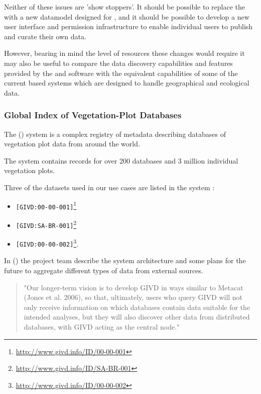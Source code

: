 \documentclass{article}
\begin{document}
Neither of these issues are 'show stoppers'. It should be possible to replace the \cite{ivoa}
\cite{ivoa.obscore} with a new datamodel designed for \cite{trop}, and it should be possible
to develop a new user interface and permission infrastructure to enable individual users
to publish and curate their own data.

However, bearing in mind the level of resources these changes would require it may also be
useful to compare the data discovery capabilities and features provided by the \cite{ivoa} and
\cite{astro} software with the equivalent capabilities of some of the current \cite{gis}
based systems which are designed to handle geographical and ecological data.

\subsubsection{Global Index of Vegetation-Plot Databases}

The  (\cite{givd}) system is a complex registry of metadata describing
databases of vegetation plot data from around the world.

The \cite{givd} system contains records for over 200 databases and 3 million individual
vegetation plots.

Three of the datasets used in our use cases are listed in the \cite{givd} system :

\begin{itemize}
\item \cite{forest-plots} \texttt{[GIVD:00-00-001]}\footnote{\url{http://www.givd.info/ID/00-00-001}}
\item \cite{ppbio} \texttt{[GIVD:SA-BR-001]}\footnote{\url{http://www.givd.info/ID/SA-BR-001}}
\item \cite{team}  \texttt{[GIVD:00-00-002]}\footnote{\url{http://www.givd.info/ID/00-00-002}}.
\end{itemize}

In  (\cite{dengler-2011}) the \cite{givd} project team describe the system
architecture and some plans for the future to aggregate different types of data from external sources.

\begin{quote}
"Our longer-term vision is to develop GIVD in ways similar to Metacat (Jones et
al. 2006), so that, ultimately, users who query GIVD will not only receive
information on which databases contain data suitable for the intended analyses,
but they will also discover other data from distributed databases, with GIVD
acting as the central node."
\end{quote}
\end{document}
